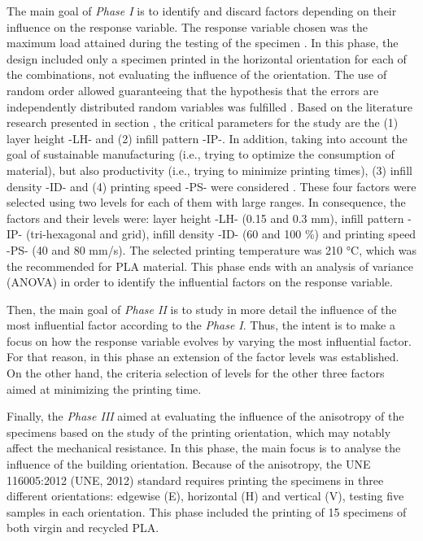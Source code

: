 \documentclass[]{interact}
\theoremstyle{plain}%
\theoremstyle{definition}
\theoremstyle{remark}
\begin{document}
The main goal of \emph{Phase I} is to identify and discard factors
depending on their influence on the response variable. The response
variable chosen was the maximum load attained during the testing of the
specimen \citep{Kumar2018b, Chacon2017, Letcher2015}. In this phase, the
design included only a specimen printed in the horizontal orientation
for each of the combinations, not evaluating the influence of the
orientation. The use of random order allowed guaranteeing that the
hypothesis that the errors are independently distributed random
variables was fulfilled \citep{Montgomery2001}. Based on the literature
research presented in section \label{section:background}, the critical
parameters for the study are the (1) layer height -LH- and (2) infill
pattern -IP-. In addition, taking into account the goal of sustainable
manufacturing (i.e., trying to optimize the consumption of material),
but also productivity (i.e., trying to minimize printing times), (3)
infill density -ID- and (4) printing speed -PS- were considered
\citep{Singh2019, Tanveer2019}. These four factors were selected using
two levels for each of them with large ranges. In consequence, the
factors and their levels were: layer height -LH- (0.15 and 0.3 mm),
infill pattern -IP- (tri-hexagonal and grid), infill density -ID- (60
and 100 \%) and printing speed -PS- (40 and 80 mm/s). The selected
printing temperature was 210 °C, which was the recommended for PLA
material. This phase ends with an analysis of variance (ANOVA) in order
to identify the influential factors on the response variable.

Then, the main goal of \emph{Phase II} is to study in more detail the
influence of the most influential factor according to the \emph{Phase
I}. Thus, the intent is to make a focus on how the response variable
evolves by varying the most influential factor. For that reason, in this
phase an extension of the factor levels was established. On the other
hand, the criteria selection of levels for the other three factors aimed
at minimizing the printing time.

Finally, the \emph{Phase III} aimed at evaluating the influence of the
anisotropy of the specimens based on the study of the printing
orientation, which may notably affect the mechanical resistance. In this
phase, the main focus is to analyse the influence of the building
orientation. Because of the anisotropy, the UNE 116005:2012 (UNE, 2012)
standard requires printing the specimens in three different
orientations: edgewise (E), horizontal (H) and vertical (V), testing
five samples in each orientation. This phase included the printing of 15
specimens of both virgin and recycled PLA.
\end{document}
